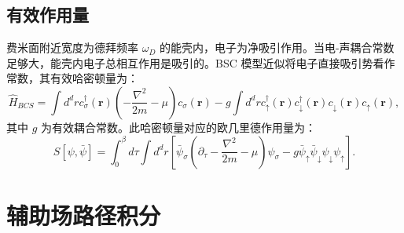 \documentclass[10pt,UTF8]{ctexart}
\begin{document}
\subsection*{有效作用量}
\noindent 费米面附近宽度为德拜频率 $\omega_D$ 的能壳内，电子为净吸引作用。当电-声耦合常数足够大，能壳内电子总相互作用是吸引的。BSC 模型近似将电子直接吸引势看作常数，其有效哈密顿量为：
\begin{equation}
	\hat H_{BCS} = \int d^dr c_\sigma^\dagger (\bm r) \left( -\frac{\nabla^2}{2m}-\mu \right) c_\sigma(\bm r)
	-g \int d^dr c_\uparrow^\dagger(\bm r) c_\downarrow^\dagger(\bm r) c_\downarrow(\bm r) c_\uparrow(\bm r),
\end{equation}
其中 $g$ 为有效耦合常数。此哈密顿量对应的欧几里德作用量为：
\begin{equation}
	S[\psi,\bar \psi] = \int_0^\beta d\tau \int d^dr \left[ \bar \psi_\sigma \left(\partial_\tau-\frac{\nabla^2}{2m}-\mu \right)\psi_\sigma -g \bar\psi_\uparrow \bar\psi_\downarrow \psi_\downarrow \psi_\uparrow \right].
\end{equation}


\section*{辅助场路径积分}
\end{document}

